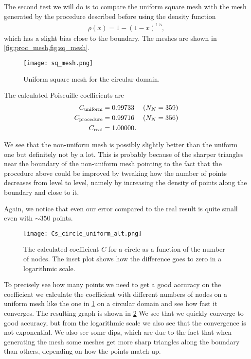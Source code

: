 \documentclass[10pt,a4paper,twocolumn]{article}
\begin{document}
The second test we will do is to compare the uniform square mesh with the mesh generated by the procedure described before using the density function
%
\begin{align}
    \rho(x) = 1 - (1 - x)^{1.5},
\end{align}
%
which has a slight bias close to the boundary. The meshes are shown in \cref{fig:proc_mesh,fig:sq_mesh}.

\begin{figure}[!h]
    \centering
    \texttt{[image: sq\_mesh.png]}
    \caption{Uniform square mesh for the circular domain.}
    \label{fig:sq_mesh}
\end{figure}

The calculated Poiseuille coefficients are
%
\begin{align}
    C_{\mathrm{uniform}} &= 0.99733 &(N_N = 359)&\notag\\
    C_{\mathrm{procedure}} &= 0.99716 &(N_N = 356)&\notag\\
    C_{\mathrm{real}} &= 1.00000.
\end{align}

We see that the non-uniform mesh is possibly slightly better than the uniform one but definitely not by a lot. This is probably because of the sharper triangles near the boundary of the non-uniform mesh  pointing to the fact that the procedure above could be improved by tweaking how the number of points decreases from level to level, namely by increasing the density of points along the boundary and close to it.

Again, we notice that even our error compared to the real result is quite small even with $\sim 350$ points.

\begin{figure}[!t]
    \centering
    \texttt{[image: Cs\_circle\_uniform\_alt.png]}
    \caption{The calculated coefficient $C$ for a circle as a function of the number of nodes. The inset plot shows how the difference goes to zero in a logarithmic scale.}
    \label{fig:Cs_conv}
\end{figure}

To precisely see how many points we need to get a good accuracy on the coefficient we calculate the coefficient with different numbers of nodes on a uniform mesh like the one in \cref{fig:sq_mesh} on a circular domain and see how fast it converges. The resulting graph is shown in \cref{fig:Cs_conv} We see that we quickly converge to good accuracy, but from the logarithmic scale we also see that the convergence is not exponential. We also see some dips, which are due to the fact that when generating the mesh some meshes get more sharp triangles along the boundary than others, depending on how the points match up.
\end{document}
